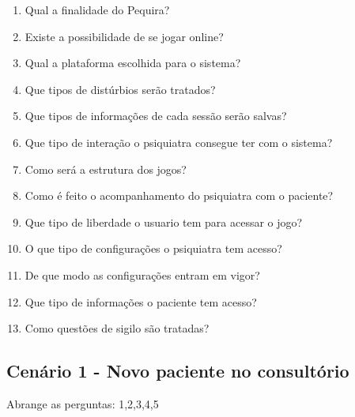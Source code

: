 \documentclass[12pt]{article}
\begin{document}
\begin{enumerate}
\item Qual a finalidade do Pequira? %
\item Existe a possibilidade de se jogar online? %
\item Qual a plataforma escolhida para o sistema? %
\item Que tipos de distúrbios serão tratados? %
\item Que tipos de informações de cada sessão serão salvas? %
\item Que tipo de interação o psiquiatra consegue ter com o sistema? %
\item Como será a estrutura dos jogos? %
\item Como é feito o acompanhamento do psiquiatra com o paciente? %
\item Que tipo de liberdade o usuario tem para acessar o jogo? %
\item O que tipo de configurações o psiquiatra tem acesso? %
\item De que modo as configurações entram em vigor?  %
\item Que tipo de informações o paciente tem acesso? %
\item Como questões de sigilo são tratadas? %
\end{enumerate}

\newpage
\subsection{Cenário 1 - Novo paciente no consultório}
Abrange as perguntas: 1,2,3,4,5
\end{document}
